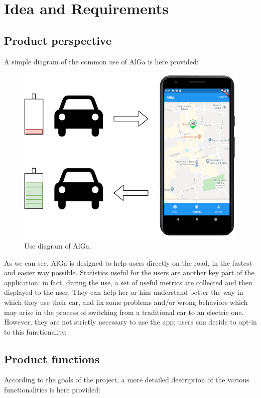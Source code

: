 \chapter{Idea and Requirements}
\label{chap:ideaAndRequirements}
\section{Product perspective}
A simple diagram of the common use of AlGa is here provided:
\begin{figure}[H]
\includegraphics[width=\linewidth]{Pics/idea}
\caption{Use diagram of AlGa.}
\end{figure}
As we can see, AlGa is designed to help users directly on the road, in the fastest and easier way possible. Statistics useful for the users are another key part of the application: in fact, during the use, a set of useful metrics are collected and then displayed to the user. They can help her or him understand better the way in which they use their car, and fix some problems and/or wrong behaviors which may arise in the process of switching from a traditional car to an electric one. However, they are not strictly necessary to use the app; users can decide to opt-in to this functionality.
		
\section{Product functions}
According to the goals of the project, a more detailed description of the various functionalities is here provided:

